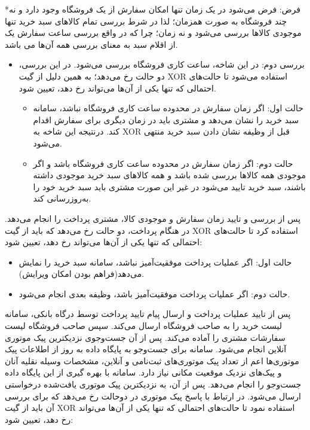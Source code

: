 \documentclass[14pt]{article}
\begin{document}
*فرض: فرض می‌شود در یک زمان تنها امکان سفارش از یک فروشگاه وجود دارد و نه چند فروشگاه به صورت همزمان؛‌ لذا در شرط بررسی تمام کالاهای سبد خرید تنها موجودی کالاها بررسی می‌شود و نه زمان؛‌ چرا که در واقع بررسی ساعت سفارش یک از اقلام سبد به معنای بررسی همه آن‌ها می باشد.
\begin{flushright}
\begin{itemize}
\item بررسی دوم: در این شاخه، ساعت کاری فروشگاه بررسی می‌شود. در این بررسی، دو حالت رخ می‌دهد؛ به همین دلیل از گیت XOR استفاده می‌شود تا حالت‌های احتمالی که تنها یکی از آن‌ها می‌تواند رخ دهد، تعیین شود.

\begin{flushright}
\begin{itemize}
\item حالت اول: اگر زمان سفارش در محدوده ساعت کاری فروشگاه نباشد، سامانه سبد خرید را نشان می‌دهد و مشتری باید در زمان دیگری برای سفارش اقدام کند. درنتیجه این شاخه به XOR قبل از وظیفه نشان دادن سبد خرید منتهی می‌شود.
\item حالت دوم: اگر زمان سفارش در محدوده ساعت کاری فروشگاه باشد و اگر موجودی همه کالا‌ها بررسی شده باشد و همه کالاهای سبد خرید موجودی داشته باشند، سبد خرید تایید می‌شود در غیر این صورت مشتری باید سبد خرید خود را به‌روزرسانی کند.
\end{itemize}
\end{flushright}
\end{itemize}
\end{flushright}

پس از بررسی و تایید زمان سفارش و موجودی کالا، مشتری پرداخت را انجام می‌دهد. در هنگام پرداخت، دو حالت رخ می‌دهد که باید از گیت XOR استفاده کرد تا حالت‌های احتمالی که تنها یکی از آن‌ها می‌تواند رخ دهد، تعیین شود:
\begin{flushright}
\begin{itemize}
\item حالت اول: اگر عملیات پرداخت موفقیت‌آمیز نباشد، سامانه سبد خرید را نمایش می‌دهد(فراهم بودن امکان ویرایش).
\item حالت دوم: اگر عملیات پرداخت موفقیت‌آمیز باشد، وظیفه بعدی انجام می‌شود.
\end{itemize}
\end{flushright}

پس از تایید عملیات پرداخت و ارسال پیام تایید پرداخت توسط درگاه بانکی، سامانه لیست خرید را به صاحب فروشگاه ارسال می‌کند. سپس صاحب فروشگاه لیست سفارشات مشتری را آماده می‌کند. پس از آن جست‌وجوی نزدیکترین پیک موتوری آنلاین انجام می‌شود. سامانه برای جست‌و‌جو به پایگاه داده به روز از اطلاعات پیک موتوری‌ها اعم از تعداد پیک موتوری‌های ثبت‌نامی و آنلاین، مشخصات وسیله نقلیه آنان و پیک‌های نزدیک موقعیت مکانی نیاز دارد. سامانه با بهره گیری از این پایگاه داده جست‌و‌جو را انجام می‌دهد. پس از آن، به نزدیکترین پیک موتوری یافت‌شده درخواستی ارسال می‌شود. در ارتباط با پاسخ پیک موتوری در دوحالت رخ می‌دهد که برای بررسی آن باید از گیت XOR استفاده نمود تا حالت‌های احتمالی که تنها یکی از آن‌ها می‌تواند رخ دهد، تعیین شود:
\end{document}
